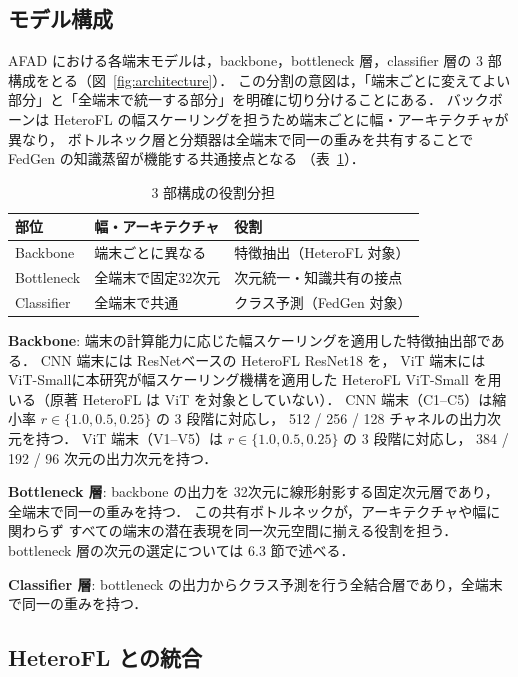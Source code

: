 \subsection{モデル構成}

AFAD における各端末モデルは，backbone，bottleneck 層，classifier 層の 3 部構成をとる（図~\ref{fig:architecture}）．
この分割の意図は，「端末ごとに変えてよい部分」と「全端末で統一する部分」を明確に切り分けることにある．
バックボーンは HeteroFL の幅スケーリングを担うため端末ごとに幅・アーキテクチャが異なり，
ボトルネック層と分類器は全端末で同一の重みを共有することで FedGen の知識蒸留が機能する共通接点となる
（表~\ref{tab:role_summary}）．

\begin{table}[htb]
  \centering
  \caption{3 部構成の役割分担}
  \label{tab:role_summary}
  \begin{tabular}{lp{2.4cm}p{3.2cm}}
    \toprule
    部位 & 幅・アーキテクチャ & 役割 \\
    \midrule
    Backbone   & 端末ごとに異なる & 特徴抽出（HeteroFL 対象） \\
    Bottleneck & 全端末で固定32次元 & 次元統一・知識共有の接点 \\
    Classifier & 全端末で共通 & クラス予測（FedGen 対象） \\
    \bottomrule
  \end{tabular}
\end{table}

\textbf{Backbone}:
端末の計算能力に応じた幅スケーリングを適用した特徴抽出部である．
CNN 端末には ResNet\cite{ResNet}ベースの HeteroFL ResNet18 を，
ViT 端末には ViT-Small\cite{VisionTransformer}に本研究が幅スケーリング機構を適用した
HeteroFL ViT-Small を用いる（原著 HeteroFL\cite{HeteroFL} は ViT を対象としていない）．
CNN 端末（C1–C5）は縮小率 $r \in \{1.0, 0.5, 0.25\}$ の 3 段階に対応し，
512 / 256 / 128 チャネルの出力次元を持つ．
ViT 端末（V1–V5）は $r \in \{1.0, 0.5, 0.25\}$ の 3 段階に対応し，
384 / 192 / 96 次元の出力次元を持つ．

\textbf{Bottleneck 層}:
backbone の出力を 32次元に線形射影する固定次元層であり，全端末で同一の重みを持つ．
この共有ボトルネックが，アーキテクチャや幅に関わらず
すべての端末の潜在表現を同一次元空間に揃える役割を担う．
bottleneck 層の次元の選定については 6.3 節で述べる．

\textbf{Classifier 層}:
bottleneck の出力からクラス予測を行う全結合層であり，全端末で同一の重みを持つ．

\subsection{HeteroFL との統合}

